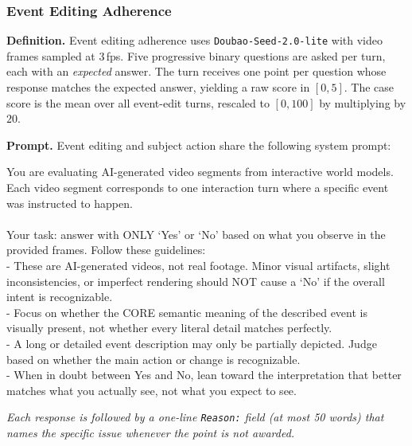 \documentclass{llmxive}
\providecommand{\myparagraph}[1]{\vspace{-0.1em}\noindent\textbf{#1}\hspace{0.3em}}
\begin{document}
\subsubsection{Event Editing Adherence}
\label{app:event_edit_detail}

\myparagraph{Definition.}
Event editing adherence uses \texttt{Doubao-Seed-2.0-lite} with video frames sampled at 3\,fps. Five progressive binary questions are asked per turn, each with an \emph{expected} answer. The turn receives one point per question whose response matches the expected answer, yielding a raw score in $[0,5]$. The case score is the mean over all event-edit turns, rescaled to $[0, 100]$ by multiplying by $20$.

\myparagraph{Prompt.}
Event editing and subject action share the following system prompt:

\begin{tcolorbox}[d3box, title={Shared System Prompt (event editing \& subject action)}]
\begin{tcolorbox}[systemprompt]
You are evaluating AI-generated video segments from interactive world models. Each video segment corresponds to one interaction turn where a specific event was instructed to happen.\\
\\
Your task: answer with ONLY `Yes' or `No' based on what you observe in the provided frames. Follow these guidelines:\\
- These are AI-generated videos, not real footage. Minor visual artifacts, slight inconsistencies, or imperfect rendering should NOT cause a `No' if the overall intent is recognizable.\\
- Focus on whether the CORE semantic meaning of the described event is visually present, not whether every literal detail matches perfectly.\\
- A long or detailed event description may only be partially depicted. Judge based on whether the main action or change is recognizable.\\
- When in doubt between Yes and No, lean toward the interpretation that better matches what you actually see, not what you expect to see.
\end{tcolorbox}
\vspace{2pt}
\textit{\small Each response is followed by a one-line \texttt{Reason:} field (at most 50 words) that names the specific issue whenever the point is not awarded.}
\end{tcolorbox}

\vspace{6pt}
\end{document}
